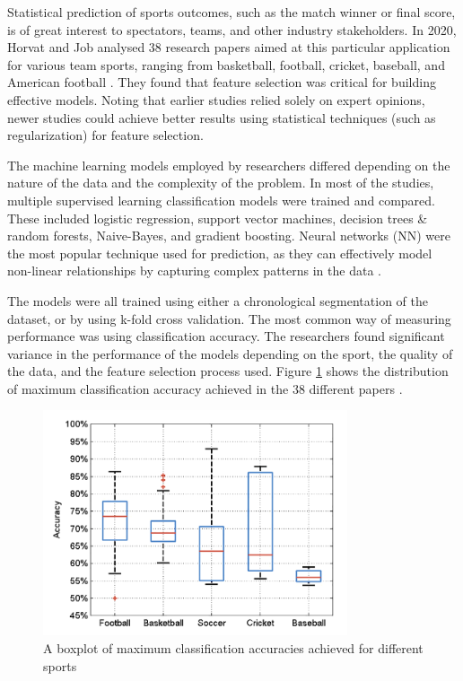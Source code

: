 Statistical prediction of sports outcomes, such as the match winner or final score, is of great interest to spectators, teams, and other industry stakeholders. In 2020, Horvat and Job analysed 38 research papers aimed at this particular application for various team sports, ranging from basketball, football, cricket, baseball, and American football \cite{mlsports}. They found that feature selection was critical for building effective models. Noting that earlier studies relied solely on expert opinions, newer studies could achieve better results using statistical techniques (such as regularization) for feature selection. 

The machine learning models employed by researchers differed depending on the nature of the data and the complexity of the problem. In most of the studies, multiple supervised learning classification models were trained and compared. These included logistic regression, support vector machines, decision trees \& random forests, Naive-Bayes, and gradient boosting. Neural networks (NN) were the most popular technique used for prediction, as they can effectively model non-linear relationships by capturing complex patterns in the data \cite{nnoverview}. 

The models were all trained using either a chronological segmentation of the dataset, or by using k-fold cross validation. The most common way of measuring performance was using classification accuracy. The researchers found significant variance in the performance of the models depending on the sport, the quality of the data, and the feature selection process used. Figure \ref{fig:mlsports} shows the distribution of maximum classification accuracy achieved in the 38 different papers \cite{mlsports}.

\begin{figure}[h]
	\centering
	\includegraphics[width=0.8\textwidth]{Figures/mlsports.png}
	\caption{A boxplot of maximum classification accuracies achieved for different sports \cite{mlsports}}
	\label{fig:mlsports}
\end{figure}

